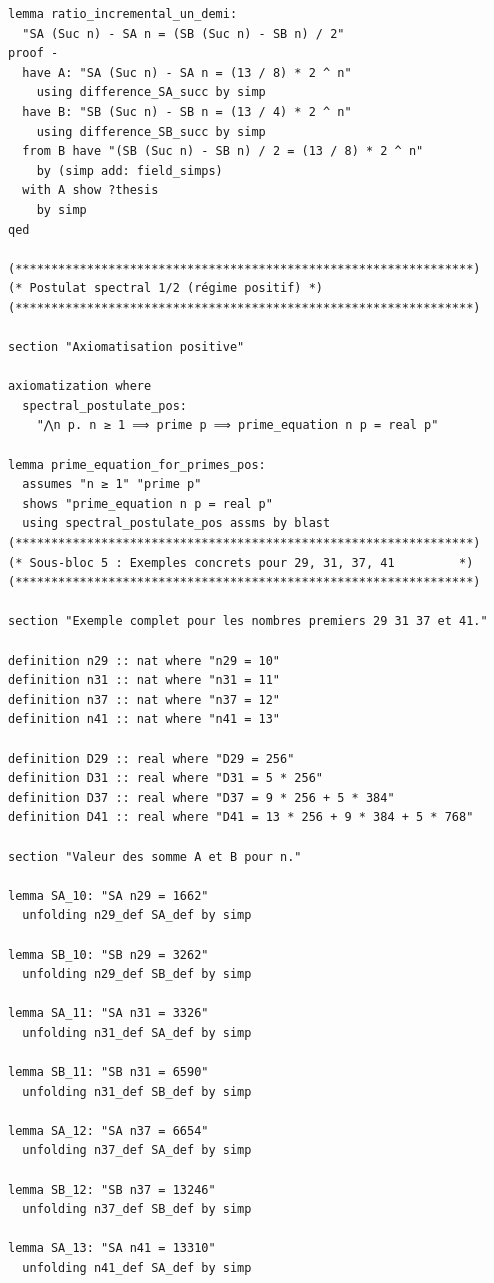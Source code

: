 \documentclass[a4paper,11pt]{article}
\begin{document}
\begin{holcode}[title={\textcolor{white}{Fichier : methode\_spectral.thy -- Partie 1/4}}]
\begin{lstlisting}
lemma ratio_incremental_un_demi:
  "SA (Suc n) - SA n = (SB (Suc n) - SB n) / 2"
proof -
  have A: "SA (Suc n) - SA n = (13 / 8) * 2 ^ n"
    using difference_SA_succ by simp
  have B: "SB (Suc n) - SB n = (13 / 4) * 2 ^ n"
    using difference_SB_succ by simp
  from B have "(SB (Suc n) - SB n) / 2 = (13 / 8) * 2 ^ n"
    by (simp add: field_simps)
  with A show ?thesis
    by simp
qed

(****************************************************************)
(* Postulat spectral 1/2 (régime positif) *)
(****************************************************************)

section "Axiomatisation positive"

axiomatization where
  spectral_postulate_pos:
    "⋀n p. n ≥ 1 ⟹ prime p ⟹ prime_equation n p = real p"

lemma prime_equation_for_primes_pos:
  assumes "n ≥ 1" "prime p"
  shows "prime_equation n p = real p"
  using spectral_postulate_pos assms by blast
(****************************************************************)
(* Sous-bloc 5 : Exemples concrets pour 29, 31, 37, 41         *)
(****************************************************************)

section "Exemple complet pour les nombres premiers 29 31 37 et 41."

definition n29 :: nat where "n29 = 10"
definition n31 :: nat where "n31 = 11"
definition n37 :: nat where "n37 = 12"
definition n41 :: nat where "n41 = 13"

definition D29 :: real where "D29 = 256"
definition D31 :: real where "D31 = 5 * 256"
definition D37 :: real where "D37 = 9 * 256 + 5 * 384"
definition D41 :: real where "D41 = 13 * 256 + 9 * 384 + 5 * 768"

section "Valeur des somme A et B pour n."

lemma SA_10: "SA n29 = 1662"
  unfolding n29_def SA_def by simp

lemma SB_10: "SB n29 = 3262"
  unfolding n29_def SB_def by simp

lemma SA_11: "SA n31 = 3326"
  unfolding n31_def SA_def by simp

lemma SB_11: "SB n31 = 6590"
  unfolding n31_def SB_def by simp

lemma SA_12: "SA n37 = 6654"
  unfolding n37_def SA_def by simp

lemma SB_12: "SB n37 = 13246"
  unfolding n37_def SB_def by simp

lemma SA_13: "SA n41 = 13310"
  unfolding n41_def SA_def by simp


\end{lstlisting}
\end{holcode}
\end{document}
